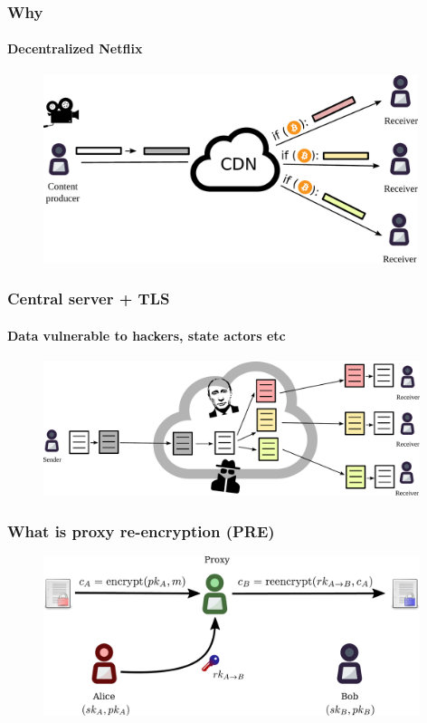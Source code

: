\documentclass[xetex,mathsans,sans,aspectratio=169]{beamer}
\begin{document}
    \begin{frame}
        \frametitle{Why}
        \framesubtitle{Decentralized Netflix}
        \begin{figure}
            \centering
            \includegraphics[height=5.5cm]{pdf/streams.pdf}
        \end{figure}
    \end{frame}

    \begin{frame}
        \frametitle{Central server + TLS}
        \framesubtitle{Data vulnerable to hackers, state actors etc}
        \begin{figure}
            \centering
            \includegraphics[width=11cm]{pdf/file-sharing-tls.pdf}
        \end{figure}
    \end{frame}

    \begin{frame}
        \frametitle{What is proxy re-encryption (PRE)}
        \begin{figure}
            \centering
            \includegraphics[width=11cm]{pdf/pre.pdf}
        \end{figure}
    \end{frame}
\end{document}
